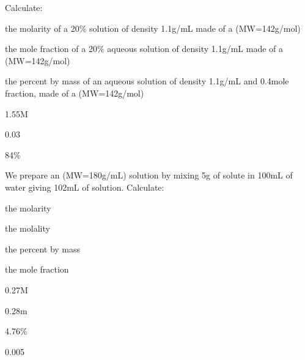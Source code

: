\documentclass[main.tex]{subfiles}
\begin{document}
\begin{multicols*}{2}
\begin{question}[ID=\the\value{numA}]
Calculate: 
\begin{inparaenum}[(a)]
\item  the molarity of a 20\% solution of density 1.1g/mL made of a (MW=142g/mol) %
\item  the mole fraction of a 20\% aqueous solution of density 1.1g/mL made of a (MW=142g/mol) %
\item  the percent by mass of an aqueous solution of density 1.1g/mL and 0.4mole fraction, made of a (MW=142g/mol) %
\end{inparaenum}
\end{question}
\begin{solution}
\begin{inparaenum}[(a)]
\item   1.55M 
\item   0.03 
\item   84\% 
 \end{inparaenum}\hspace{0.1cm}\end{solution}%




\begin{question}[ID=\the\value{numA}]
We prepare an  (MW=180g/mL) solution by mixing 5g of solute in 100mL of water giving 102mL of solution. Calculate:
\begin{inparaenum}[(a)]
\item  the molarity  %
\item  the molality  %
\item  the percent by mass  %
\item  the mole fraction %
\end{inparaenum}
\end{question}
\begin{solution}
\begin{inparaenum}[(a)]
\item   0.27M 
\item   0.28m 
\item   4.76\% 
\item   0.005  
 \end{inparaenum}\hspace{0.1cm}\end{solution}%



\end{multicols*}
\end{document}
